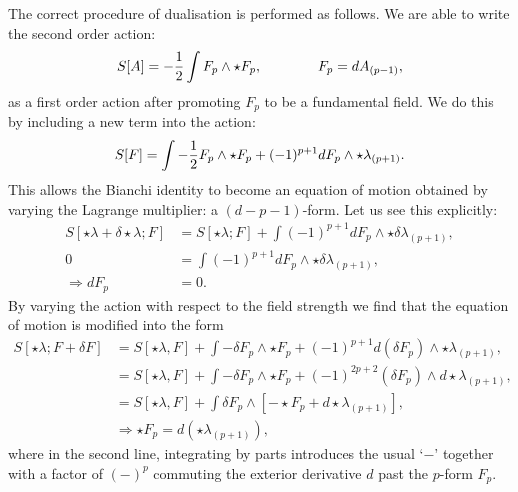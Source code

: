 The correct procedure of dualisation is performed as follows. We are able to write the second order action:
\begin{equation*}
S[A] = -\frac{1}{2} \int F_{p} \wedge \star  F_p, \qquad \qquad F_{p} = dA_{(p-1)},
\end{equation*}
as a first order action after promoting $F_{p}$ to be a fundamental field. We do this by including a new term into the action:
\begin{equation}
\label{eq:firstorderapp1}
S[F] = \int -\frac{1}{2}  F_{p} \wedge \star F_{p} + (-1)^{p+1} d F_p \wedge \star \lambda_{(p+1)}.
\end{equation}
This allows the Bianchi identity to become an equation of motion obtained by varying the Lagrange multiplier: a $(d-p-1)$-form. Let us see this explicitly:
\begin{equation*}
\begin{aligned}
S[ \star \lambda + \delta \star \lambda; F] &= S[ \star \lambda; F] + \int (-1)^{p+1} dF_{p} \wedge \star \delta \lambda_{(p+1)}, \\
0 &= \int (-1)^{p+1} dF_{p} \wedge \star \delta \lambda_{(p+1)}, \\
\Rightarrow dF_{p} &= 0.
\end{aligned}
\end{equation*}
By varying the action with respect to the field strength we find that the equation of motion is modified into the form
\begin{equation*}
\begin{aligned}
		S[ \star \lambda; F + \delta F] &= S[\star \lambda, F] + \int - \delta F_p \wedge \star  F_p + (-1)^{p+1} d(\delta F_p)\wedge \star \lambda_{(p+1)},\\
		&= S[\star \lambda, F] + \int - \delta F_p \wedge \star  F_p + (-1)^{2 p+2} (\delta F_p)\wedge d \star \lambda_{(p+1)},\\
		&= S[\star \lambda, F] + \int \delta F_p  \wedge \left[ - \star  F_p + d \star \lambda_{(p+1)} \right], \\
		&\Rightarrow \star F_p = d(\star \lambda_{(p+1)}),
\end{aligned}
\end{equation*}
where in the second line, integrating by parts introduces the usual `$-$' together with a factor of $(-)^{p}$ commuting the exterior derivative $d$ past the $p$-form $F_p$.

